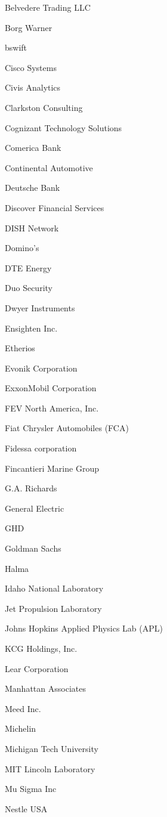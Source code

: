 \documentclass[twoside]{article}
\begin{document}
\begin{center}
\begin{multicols}{5}
\begin{FlushLeft}
\begin{compactitem}
\item Belvedere Trading LLC
\item Borg Warner
\item bswift
\item Cisco Systems
\item Civis Analytics
\item Clarkston Consulting
\item Cognizant Technology Solutions
\item Comerica Bank
\item Continental Automotive
\item Deutsche Bank
\item Discover Financial Services
\item DISH Network
\item Domino's
\item DTE Energy
\item Duo Security
\item Dwyer Instruments
\item Ensighten Inc.
\item Etherios
\item Evonik Corporation
\item ExxonMobil Corporation
\item FEV North America, Inc.
\item Fiat Chrysler Automobiles (FCA)
\item Fidessa corporation
\item Fincantieri Marine Group
\item G.A. Richards
\item General Electric
\item GHD
\item Goldman Sachs
\item Halma
\item Idaho National Laboratory
\item Jet Propulsion Laboratory
\item Johns Hopkins Applied Physics Lab (APL)
\item KCG Holdings, Inc.
\item Lear Corporation
\item Manhattan Associates
\item Meed Inc.
\item Michelin
\item Michigan Tech University
\item MIT Lincoln Laboratory
\item Mu Sigma Inc
\item Nestle USA

\end{compactitem}
\end{FlushLeft}
\end{multicols}
\end{center}
\end{document}
